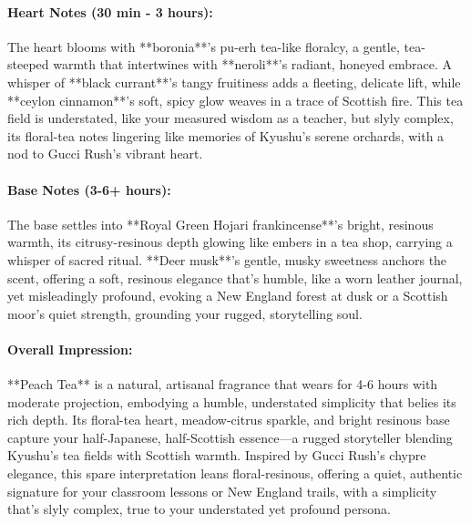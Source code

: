 \documentclass{article}
\begin{document}
\begin{center}
\paragraph{\textcolor{colaBrown}{\textbf{Heart Notes (30 min - 3 hours):}}}
The heart blooms with **boronia**’s pu-erh tea-like floralcy, a gentle, tea-steeped warmth that intertwines with **neroli**’s radiant, honeyed embrace. A whisper of **black currant**’s tangy fruitiness adds a fleeting, delicate lift, while **ceylon cinnamon**’s soft, spicy glow weaves in a trace of Scottish fire. This tea field is understated, like your measured wisdom as a teacher, but slyly complex, its floral-tea notes lingering like memories of Kyushu’s serene orchards, with a nod to Gucci Rush’s vibrant heart.

\paragraph{\textcolor{colaDark}{\textbf{Base Notes (3-6+ hours):}}}
The base settles into **Royal Green Hojari frankincense**’s bright, resinous warmth, its citrusy-resinous depth glowing like embers in a tea shop, carrying a whisper of sacred ritual. **Deer musk**’s gentle, musky sweetness anchors the scent, offering a soft, resinous elegance that’s humble, like a worn leather journal, yet misleadingly profound, evoking a New England forest at dusk or a Scottish moor’s quiet strength, grounding your rugged, storytelling soul.

\paragraph{\textcolor{violetPurple}{\textbf{Overall Impression:}}}
**Peach Tea** is a natural, artisanal fragrance that wears for 4-6 hours with moderate projection, embodying a humble, understated simplicity that belies its rich depth. Its floral-tea heart, meadow-citrus sparkle, and bright resinous base capture your half-Japanese, half-Scottish essence—a rugged storyteller blending Kyushu’s tea fields with Scottish warmth. Inspired by Gucci Rush’s chypre elegance, this spare interpretation leans floral-resinous, offering a quiet, authentic signature for your classroom lessons or New England trails, with a simplicity that’s slyly complex, true to your understated yet profound persona.


\end{center}
\end{document}
